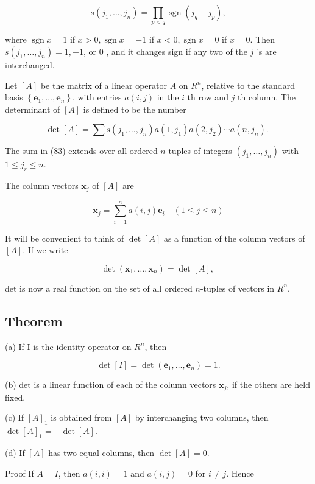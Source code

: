 \documentclass[10pt]{article}
\begin{document}
$$
s\left(j_{1}, \ldots, j_{n}\right)=\prod_{p<q} \operatorname{sgn}\left(j_{q}-j_{p}\right),
$$

where $\operatorname{sgn} x=1$ if $x>0, \operatorname{sgn} x=-1$ if $x<0, \operatorname{sgn} x=0$ if $x=0$. Then $s\left(j_{1}, \ldots, j_{n}\right)=1,-1$, or 0 , and it changes sign if any two of the $j$ 's are interchanged.

Let $[A]$ be the matrix of a linear operator $A$ on $R^{n}$, relative to the standard basis $\left\{\mathbf{e}_{1}, \ldots, \mathbf{e}_{n}\right\}$, with entries $a(i, j)$ in the $i$ th row and $j$ th column. The determinant of $[A]$ is defined to be the number

$$
\operatorname{det}[A]=\sum s\left(j_{1}, \ldots, j_{n}\right) a\left(1, j_{1}\right) a\left(2, j_{2}\right) \cdots a\left(n, j_{n}\right) \text {. }
$$

The sum in (83) extends over all ordered $n$-tuples of integers $\left(j_{1}, \ldots, j_{n}\right)$ with $1 \leq j_{r} \leq n$.

The column vectors $\mathbf{x}_{j}$ of $[A]$ are

$$
\mathbf{x}_{j}=\sum_{i=1}^{n} a(i, j) \mathbf{e}_{i} \quad(1 \leq j \leq n)
$$

It will be convenient to think of $\operatorname{det}[A]$ as a function of the column vectors of $[A]$. If we write

$$
\operatorname{det}\left(\mathbf{x}_{1}, \ldots, \mathbf{x}_{n}\right)=\operatorname{det}[A] \text {, }
$$

det is now a real function on the set of all ordered $n$-tuples of vectors in $R^{n}$.

\subsection{Theorem}
(a) If I is the identity operator on $R^{n}$, then

$$
\operatorname{det}[I]=\operatorname{det}\left(\mathbf{e}_{1}, \ldots, \mathbf{e}_{n}\right)=1 .
$$

(b) det is a linear function of each of the column vectors $\mathbf{x}_{j}$, if the others are held fixed.

(c) If $[A]_{1}$ is obtained from $[A]$ by interchanging two columns, then $\operatorname{det}[A]_{1}=-\operatorname{det}[A]$.

(d) If $[A]$ has two equal columns, then $\operatorname{det}[A]=0$.

Proof If $A=I$, then $a(i, i)=1$ and $a(i, j)=0$ for $i \neq j$. Hence
\end{document}
